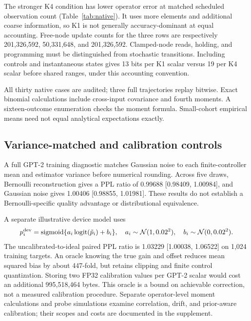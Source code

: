 \documentclass[11pt]{article}
\begin{document}
The stronger K4 condition has lower operator error at matched scheduled observation count (Table~\ref{tab:native}). It uses more elements and additional coarse information, so K1 is not generally accuracy-dominant at equal accounting. Free-node update counts for the three rows are respectively 201,326,592, 50,331,648, and 201,326,592. Clamped-node reads, holding, and programming must be distinguished from stochastic transitions. Including controls and instantaneous states gives 13 bits per K1 scalar versus 19 per K4 scalar before shared ranges, under this accounting convention.


All thirty native cases are audited; three full trajectories replay bitwise. Exact binomial calculations include cross-input covariance and fourth moments. A sixteen-outcome enumeration checks the moment formula. Small-cohort empirical means need not equal analytical expectations exactly.

\subsection{Variance-matched and calibration controls}
A full GPT-2 training diagnostic matches Gaussian noise to each finite-controller mean and estimator variance before numerical rounding. Across five draws, Bernoulli reconstruction gives a PPL ratio of 0.99688 [0.98409, 1.00984], and Gaussian noise gives 1.00406 [0.98855, 1.01981]. These results do not establish a Bernoulli-specific quality advantage or distributional equivalence.

A separate illustrative device model uses
\begin{equation}
 p_i^{\rm dev}=\operatorname{sigmoid}\{a_i\operatorname{logit}(\tilde p_i)+b_i\},\quad
 a_i\sim\mathcal N(1,0.02^2),\quad b_i\sim\mathcal N(0,0.02^2).
\end{equation}
The uncalibrated-to-ideal paired PPL ratio is 1.03229 [1.00038, 1.06522] on 1,024 training targets. An oracle knowing the true gain and offset reduces mean squared bias by about 447-fold, but retains clipping and finite control quantization. Storing two FP32 calibration values per GPT-2 scalar would cost an additional 995,518,464 bytes. This oracle is a bound on achievable correction, not a measured calibration procedure. Separate operator-level moment calculations and probe simulations examine correlation, drift, and prior-aware calibration; their scopes and costs are documented in the supplement.
\end{document}
